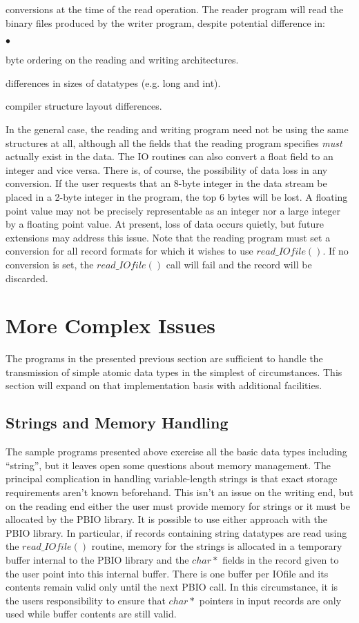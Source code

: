 \documentclass{article}
\begin{document}
conversions at the time of the read operation.  The reader program will read
the binary files produced by the writer program, despite potential difference
in: 
\begin{list}{$\bullet$\hfill}{\let\makelabel\descriptionlabel\setlength{\itemsep}{0in}\setlength{\topsep}{0in}}
\item byte ordering on the reading and writing architectures.
\item differences in sizes of datatypes (e.g. long and int).
\item compiler structure layout differences.
\end{list}
In the general case, the reading and writing program need not be using the
same structures at all, although all the fields that the reading program
specifies {\em must} actually exist in the data.  The IO routines can also
convert a float field to an integer and vice versa.  There is, of
course, the possibility of data loss in any conversion.  If the user requests
that an 8-byte integer in the data stream be placed in a 2-byte integer in the
program, the top 6 bytes will be lost.  A floating point value may not be
precisely representable as an integer nor a large integer by a floating point
value.  At present, loss of data occurs quietly, but future extensions may
address this issue.  Note that the reading program must set a conversion
for all record formats for which it wishes to use $read\_IOfile()$.  If no
conversion is set, the $read\_IOfile()$ call will fail and the record will be
discarded.  

\section{More Complex Issues}
The programs in the presented previous section are sufficient to handle the
transmission of simple atomic data types in the simplest of circumstances.
This section will expand on that implementation basis with additional
facilities. 

\subsection{Strings and Memory Handling\label{stringmem}}

The sample programs presented above exercise all the basic data types
including ``string'', but it leaves open some questions about memory
management.  The principal complication in handling variable-length strings is
that exact storage requirements aren't known beforehand.  This isn't an issue
on the writing end, but on the reading end either the user must provide memory
for strings or it must be allocated by the PBIO library.  It is possible to
use either approach with the PBIO library.  In particular, if records
containing string datatypes are read using the $read\_IOfile()$ routine,
memory for the strings is allocated in a temporary buffer internal to the PBIO
library and the $char*$ fields in the record given to the user point into this
internal buffer.  There is one buffer per IOfile and its contents remain valid
only until the next PBIO call.  In this circumstance, it is the users
responsibility to ensure that $char*$ pointers in input records are only used
while buffer contents are still valid.
\end{document}
